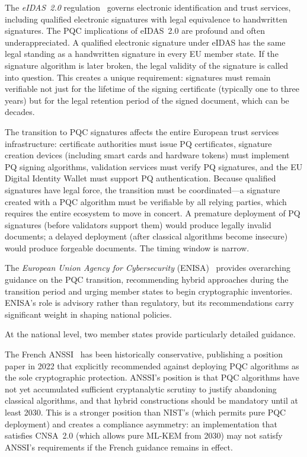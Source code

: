 The \emph{eIDAS~2.0} regulation~\cite{eIDAS2} governs electronic identification and trust services, including qualified electronic signatures with legal equivalence to handwritten signatures. The PQC implications of eIDAS~2.0 are profound and often underappreciated. A qualified electronic signature under eIDAS has the same legal standing as a handwritten signature in every EU member state. If the signature algorithm is later broken, the legal validity of the signature is called into question. This creates a unique requirement: signatures must remain verifiable not just for the lifetime of the signing certificate (typically one to three years) but for the legal retention period of the signed document, which can be decades.

The transition to PQC signatures affects the entire European trust services infrastructure: certificate authorities must issue PQ certificates, signature creation devices (including smart cards and hardware tokens) must implement PQ signing algorithms, validation services must verify PQ signatures, and the EU Digital Identity Wallet must support PQ authentication. Because qualified signatures have legal force, the transition must be coordinated---a signature created with a PQC algorithm must be verifiable by all relying parties, which requires the entire ecosystem to move in concert. A premature deployment of PQ signatures (before validators support them) would produce legally invalid documents; a delayed deployment (after classical algorithms become insecure) would produce forgeable documents. The timing window is narrow.

The \emph{European Union Agency for Cybersecurity} (ENISA)~\cite{ENISA-PQC2022} provides overarching guidance on the PQC transition, recommending hybrid approaches during the transition period and urging member states to begin cryptographic inventories. ENISA's role is advisory rather than regulatory, but its recommendations carry significant weight in shaping national policies.

At the national level, two member states provide particularly detailed guidance.

The French ANSSI~\cite{ANSSI-PQC2022} has been historically conservative, publishing a position paper in 2022 that explicitly recommended against deploying PQC algorithms as the sole cryptographic protection. ANSSI's position is that PQC algorithms have not yet accumulated sufficient cryptanalytic scrutiny to justify abandoning classical algorithms, and that hybrid constructions should be mandatory until at least 2030. This is a stronger position than NIST's (which permits pure PQC deployment) and creates a compliance asymmetry: an implementation that satisfies CNSA~2.0 (which allows pure ML-KEM from 2030) may not satisfy ANSSI's requirements if the French guidance remains in effect.

